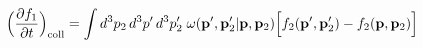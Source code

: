 \documentclass[preview]{standalone}
\begin{document}
\begin{align*}
\special{dvisvgm:raw <g id='unique000'>}\Big(\pdv{f_1}{t}\Big)_{\rm coll}=\int d^3p_2\,d^3p'\,d^3p_2'\;\omega(\va p',\va p_2'|\va p,\va p_2)\Big[f_2(\va p',\va p_2')-f_2(\va p,\va p_2)\Big]\special{dvisvgm:raw </g>}
\end{align*}
\end{document}
